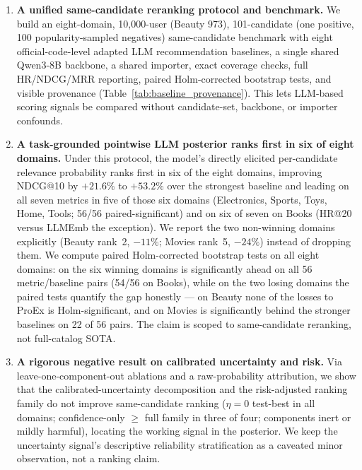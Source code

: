 \begin{enumerate}
    \item \textbf{A unified same-candidate reranking protocol and benchmark.}
    We build an eight-domain, 10{,}000-user (Beauty 973), 101-candidate (one
    positive, 100 popularity-sampled negatives) same-candidate benchmark with
    eight official-code-level adapted LLM recommendation baselines, a single
    shared Qwen3-8B backbone, a shared importer, exact coverage checks, full
    HR/NDCG/MRR reporting, paired Holm-corrected bootstrap tests, and visible
    provenance (Table~\ref{tab:baseline_provenance}). This lets LLM-based
    scoring signals be compared without candidate-set, backbone, or
    importer confounds.

    \item \textbf{A task-grounded pointwise LLM posterior ranks first in six of
    eight domains.} Under this protocol, the model's directly elicited
    per-candidate relevance probability ranks first in six of the eight domains,
    improving NDCG@10 by $+21.6\%$ to $+53.2\%$ over the strongest baseline and
    leading on all seven metrics in five of those six domains (Electronics,
    Sports, Toys, Home, Tools; 56/56 paired-significant) and on six of seven on
    Books (HR@20 versus LLMEmb the exception). We report the
    two non-winning domains explicitly (Beauty rank~2, $-11\%$; Movies rank~5,
    $-24\%$) instead of dropping them. We compute paired Holm-corrected bootstrap
    tests on all eight domains: on the six winning domains \method{} is
    significantly ahead on all 56 metric/baseline pairs (54/56 on Books), while on
    the two losing domains the paired tests quantify the gap honestly --- on Beauty
    none of the losses to ProEx is Holm-significant, and on Movies \method{} is
    significantly behind the stronger baselines on 22 of 56 pairs. The claim is
    scoped to same-candidate reranking, not
    full-catalog SOTA.

    \item \textbf{A rigorous negative result on calibrated uncertainty and
    risk.} Via leave-one-component-out ablations and a raw-probability
    attribution, we show that the calibrated-uncertainty decomposition and the
    risk-adjusted ranking family do not improve same-candidate ranking
    ($\eta=0$ test-best in all domains; confidence-only $\geq$ full family in
    three of four; components inert or mildly harmful), locating the working
    signal in the posterior. We keep the uncertainty signal's descriptive
    reliability stratification as a caveated minor observation, not a ranking
    claim.
\end{enumerate}
